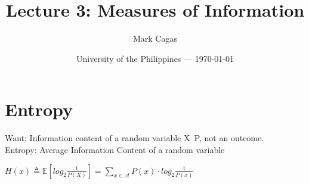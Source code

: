 \documentclass{article}
\title{Lecture 3: Measures of Information} %
\author{Mark Cagas} %
\date{University of the Philippines --- \today} %
\begin{document}
\maketitle

\section{Entropy}

\begin{flushleft}

Want: Information content of a random variable X\texttt{~}P, not an outcome. \\ 

Entropy: Average Information Content of a random variable 


$H(x) \triangleq \mathbb{E} [log_2 \frac{1}{P(X)}]=\sum_{x\in\mathcal{A}}P(x)\cdot log_2 \frac{1}{P(x)}$

\end{flushleft}
\end{document}

